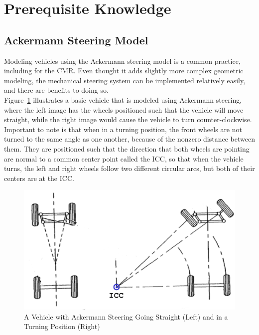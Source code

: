 \section{Prerequisite Knowledge}\label{traction_control:discussion:prereqs}
\subsection{Ackermann Steering Model}\label{traction_control:discussion:ackermann-steering-section}
Modeling vehicles using the Ackermann steering model is a common practice, including for the \ac{CMR}. Even thought it adds slightly more complex geometric modeling, the mechanical steering system can be implemented relatively easily, and there are benefits to doing so. \\

Figure~\ref{traction_control:discussion:ackermann-steering} illustrates a basic vehicle that is modeled using Ackermann steering, where the left image has the wheels positioned such that the vehicle will move straight, while the right image would cause the vehicle to turn counter-clockwise. Important to note is that when in a turning position, the front wheels are not turned to the same angle as one another, because of the nonzero distance between them. They are positioned such that the direction that both wheels are pointing are normal to a common center point called the \ac{ICC}, so that when the vehicle turns, the left and right wheels follow two different circular arcs, but both of their centers are at the \ac{ICC}.

\begin{figure}[H]
	\centering
	\includegraphics[width=.8\textwidth]{sections/discussion/images/ackermann_steering.png}
	\caption{A Vehicle with Ackermann Steering Going Straight (Left) and in a Turning Position (Right)}
	\label{traction_control:discussion:ackermann-steering}
\end{figure}


